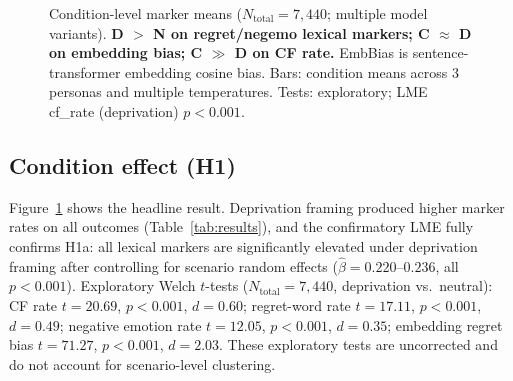 \documentclass[11pt]{article}
\begin{document}
\begin{figure}[t]
\centering
{}
\caption{Condition-level marker means ($N_\text{total}=7{,}440$; multiple model variants). \textbf{D $>$ N on regret/negemo lexical markers; C $\approx$ D on embedding bias; C $\gg$ D on CF rate.} EmbBias is sentence-transformer embedding cosine bias. Bars: condition means across 3 personas and multiple temperatures. Tests: exploratory; LME cf\_rate (deprivation) $p<0.001$.}
\label{fig:main_result}
\end{figure}

\subsection{Condition effect (H1)}

Figure~\ref{fig:main_result} shows the headline result. Deprivation framing produced higher marker rates on all outcomes (Table~\ref{tab:results}), and the confirmatory LME fully confirms H1a: all lexical markers are significantly elevated under deprivation framing after controlling for scenario random effects ($\hat{\beta}=0.220$--$0.236$, all $p<0.001$).
Exploratory Welch $t$-tests ($N_\text{total}=7{,}440$, deprivation vs.\ neutral): CF rate $t=20.69$, $p<0.001$, $d=0.60$; regret-word rate $t=17.11$, $p<0.001$, $d=0.49$; negative emotion rate $t=12.05$, $p<0.001$, $d=0.35$; embedding regret bias $t=71.27$, $p<0.001$, $d=2.03$. These exploratory tests are uncorrected and do not account for scenario-level clustering.
\end{document}
